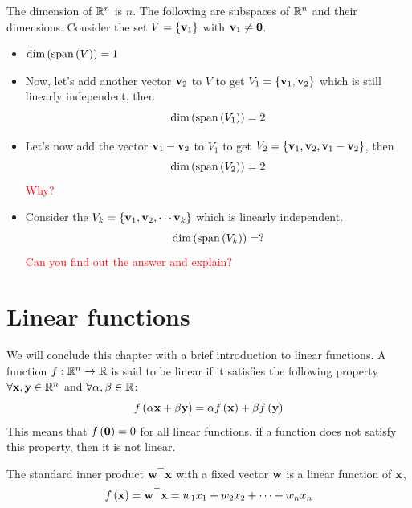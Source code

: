\begin{boxedstuff}
    \begin{example}
        The dimension of $\mathbb{R}^n$ is $n$. The following are subspaces of $\mathbb{R}^n$ and their dimensions. Consider the set $V = \left\{ \mathbf{v}_1\right\}$ with $\mathbf{v}_1 \neq \mathbf{0}$.
        \begin{itemize}
            \item $\text{dim}\left( \text{span}\left( V\right)\right) = 1$ 
            \item Now, let's add another vector $\mathbf{v}_2$ to $V$ to get $V_1 = \left\{ \mathbf{v}_1, \mathbf{v}_2 \right\}$ which is still linearly independent, then
            \[ \text{dim}\left( \text{span}\left( V_1\right)\right) = 2 \]
            \item Let's now add the vector $\mathbf{v}_1 - \mathbf{v}_2$ to $V_1$ to get $V_2 = \left\{ \mathbf{v}_1, \mathbf{v}_2, \mathbf{v}_1 - \mathbf{v}_2 \right\}$, then
            \[ \text{dim}\left( \text{span}\left( V_2\right)\right) = 2 \] \textcolor{red}{Why?}
            \item Consider the $V_k = \left\{ \mathbf{v}_1, \mathbf{v}_2, \cdots \mathbf{v}_k \right\}$ which is linearly independent.
            \[ \text{dim}\left( \text{span}\left( V_k\right)\right) = ? \] \textcolor{red}{Can you find out the answer and explain?}
        \end{itemize}
    \end{example}
\end{boxedstuff}

\section{Linear functions}\label{sec:ch01-lin-func}
We will conclude this chapter with a brief introduction to linear functions. A function $f: \mathbb{R}^n \to \mathbb{R}$ is said to be linear if it satisfies the following property $\forall \mathbf{x}, \mathbf{y} \in \mathbb{R}^n$ and $\forall \alpha, \beta \in \mathbb{R}$:
\begin{equation}
    f\left( \alpha \mathbf{x} + \beta \mathbf{y}\right) = \alpha f\left( \mathbf{x}\right) + \beta f\left( \mathbf{y}\right)
    \label{eq:linear-func-superpos}
\end{equation}
This means that $f\left( \mathbf{0}\right) = 0$ for all linear functions. if a function does not satisfy this property, then it is not linear.

The standard inner product $\mathbf{w}^\top\mathbf{x}$ with a fixed  vector $\mathbf{w}$ is a linear function of $\mathbf{x}$,
\[ f\left( \mathbf{x}\right) = \mathbf{w}^\top \mathbf{x} = w_1x_1 + w_2x_2 + \cdots + w_nx_n \]

